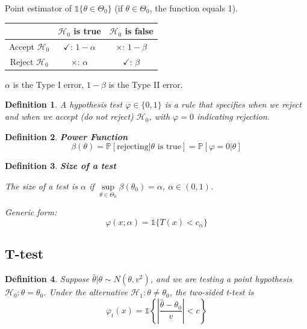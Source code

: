 \documentclass{article}
\newtheorem{definition}{Definition}
\begin{document}
\begin{note}
  Point estimator of $\mathbb{1} \{ \theta \in \Theta_0 \}$ (if $\theta \in
  \Theta_0$, the function equals 1).
\end{note}

\begin{center}
\begin{tabular}{|c|c|c|}
  \hline
  & $\mathcal{H}_0$ is true & $\mathcal{H}_0$ is false\\
  \hline
  Accept $\mathcal{H}_0$ & $\checkmark$: $1 - \alpha$ & $\times$: $1 - \beta$\\
  \hline
  Reject $\mathcal{H}_0$ & $\times$: $\alpha$ & $\checkmark$: $\beta$\\
  \hline
\end{tabular}
\end{center}

$\alpha$ is the Type I error, $1 - \beta$ is the Type II error.

\begin{definition}
  A hypothesis test $\varphi \in \{0, 1\}$ is a rule that specifies when we
  reject and when we accept (do not reject) $\mathcal{H}_0$, with $\varphi =
  0$ indicating rejection.
\end{definition}

\begin{definition}
  \textbf{Power Function}
  \[ \beta (\theta) = \mathbb{P} [\text{rejecting} | \theta \text{ is}
     \text{ true}] = \mathbb{P} [\varphi = 0 | \theta] \]
\end{definition}

\begin{definition}
  \textbf{Size of a test}
  
  The size of a test is $\alpha$ if $\underset{\theta \in \Theta_0}{\sup}
  \beta (\theta_0) = \alpha$, $\alpha \in (0, 1)$.
\end{definition}

\textit{Generic form:}
\[ \varphi (x ; \alpha) = \mathbb{1} \{ T (x) < c_{\alpha} \} \]

\subsection{T-test}

\begin{definition}
  Suppose $\hat{\theta} | \theta \sim N (\theta, v^2)$, and we are
  testing a point hypothesis $\mathcal{H}_0 : \theta = \theta_0$. Under the
  alternative $\mathcal{H}_1 : \theta \neq \theta_0$, the two-sided t-test is
  \[ \varphi_t (x) = \mathbb{1} \left\{ \left| \frac{\hat{\theta} -
     \theta_0}{v} \right| < c \right\} \]
\end{definition}
\end{document}

